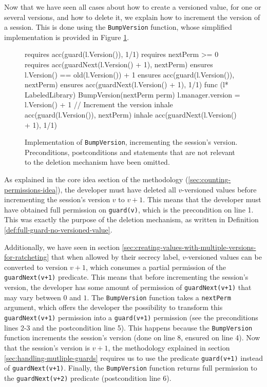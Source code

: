 Now that we have seen all cases about how to create a versioned value, for one or several versions, and how to delete it, we explain how to increment the version of a session. This is done using the \texttt{BumpVersion} function, whose simplified implementation is provided in Figure \ref{lst:bump-version}.

\begin{figure}
    \begin{gobra}
requires acc(guard(l.Version()), 1/1)
requires nextPerm >= 0
requires acc(guardNext(l.Version() + 1), nextPerm)
ensures  l.Version() == old(l.Version()) + 1
ensures  acc(guard(l.Version()), nextPerm)
ensures  acc(guardNext(l.Version() + 1), 1/1)
func (l* LabeledLibrary) BumpVersion(nextPerm perm) {
    l.manager.version = l.Version() + 1 // Increment the version
    inhale acc(guard(l.Version()), nextPerm)
    inhale acc(guardNext(l.Version() + 1), 1/1)
}
    \end{gobra}
    \caption{Implementation of \texttt{BumpVersion}, incrementing the session's version. Preconditions, postconditions and statements that are not relevant to the deletion mechanism have been omitted.}
    \label{lst:bump-version}
\end{figure}

As explained in the core idea section of the methodology (\ref{sec:counting-permissions-idea}), the developer must have deleted all $v$-versioned values before incrementing the session's version $v$ to $v+1$. This means that the developer must have obtained full permission on \texttt{guard(v)}, which is the precondition on line 1. This was exactly the purpose of the deletion mechanism, as written in Definition \ref{def:full-guard-no-versioned-value}.

Additionally, we have seen in section \ref{sec:creating-values-with-multiple-versions-for-ratcheting} that when allowed by their secrecy label, $v$-versioned values can be converted to version $v+1$, which consumes a partial permission of the \texttt{guardNext(v+1)} predicate.
This means that before incrementing the session's version, the developer has some amount of permission of \texttt{guardNext(v+1)} that may vary between $0$ and $1$.
The \texttt{BumpVersion} function takes a \texttt{nextPerm} argument, which offers the developer the possibility to transform this \texttt{guardNext(v+1)} permission into a \texttt{guard(v+1)} permission (see the preconditions lines 2-3 and the postcondition line 5).
This happens because the \texttt{BumpVersion} function increments the session's version (done on line 8, ensured on line 4).
Now that the session's version is $v+1$, the methodology explained in section \ref{sec:handling-mutliple-guards} requires us to use the predicate \texttt{guard(v+1)} instead of \texttt{guardNext(v+1)}.
Finally, the \texttt{BumpVersion} function returns full permission to the \texttt{guardNext(v+2)} predicate (postcondition line 6).

